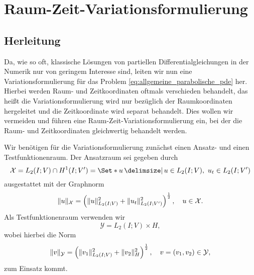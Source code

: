 
\section{Raum-Zeit-Variationsformulierung} %
\label{sec:raum_zeit_variationsformulierung}

\subsection{Herleitung} %
\label{sub:herleitung}

Da, wie so oft, klassische Lösungen von partiellen Differentialgleichungen in der Numerik nur von geringem Interesse sind, leiten wir nun eine Variationsformulierung für das Problem \eqref{eq:allgemeine_parabolische_pde} her.
Hierbei werden Raum- und Zeitkoordinaten oftmals verschieden behandelt, das heißt die Variationsformulierung wird nur bezüglich der Raumkoordinaten hergeleitet  und die Zeitkoordinate wird separat behandelt.
Dies wollen wir vermeiden und führen eine Raum-Zeit-Variationsformulierung ein, bei der die Raum- und Zeitkoordinaten gleichwertig behandelt werden.

Wir benötigen für die Variationsformulierung zunächst einen Ansatz- und einen Testfunktionenraum.
Der Ansatzraum sei gegeben durch
\begin{equation}
    \label{eq:var_all_ansatzraum_x}
    \mathcal X = L_{2}(I; V) \cap H^{1}(I; V') = \Set*{ u \given u \in L_{2}(I; V),~u_{t} \in L_{2}(I; V') }
\end{equation}
ausgestattet mit der Graphnorm
\begin{equation}
    \label{eq:var_all_ansatzraum_x_norm}
    \lVert u\rVert_{\mathcal X} = \left( \lVert u\rVert_{L_{2}(I; V)}^{2} + \lVert u_{t}\rVert_{L_{2}(I; V')}^{2} \right)^{\frac 12}, \quad u \in \mathcal X.
\end{equation}
Als Testfunktionenraum verwenden wir
\begin{equation}
    \label{eq:var_all_testraum_y}
    \mathcal Y = L_{2}(I; V) \times H,
\end{equation}
wobei hierbei die Norm
\begin{equation}
    \label{eq:var_all_testraum_y_norm}
    \lVert v\rVert_{\mathcal Y} = \left( \lVert v_{1}\rVert_{L_{2}(I; V)}^{2} + \lVert v_{2}\rVert_{H}^{2} \right)^{\frac 12}, \quad v = (v_{1}, v_{2}) \in \mathcal Y,
\end{equation}
zum Einsatz kommt.

